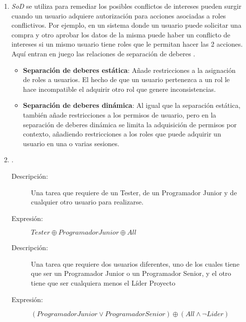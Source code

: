 \documentclass[10pt,a4paper]{article}
\begin{document}
\begin{enumerate}[label=\alph*]
\item
\textit{SoD} se utiliza para remediar los posibles conflictos de intereses pueden surgir cuando un usuario adquiere autorización para acciones asociadas a roles conflictivos. Por ejemplo, en un sistema donde un usuario puede solicitar una compra y otro aprobar los datos de la misma puede haber un conflicto de intereses si un mismo usuario tiene roles que le permitan hacer las 2 acciones. Aquí entran en juego las relaciones de separación de deberes \cite{nist}.
\begin{itemize}
\item \textbf{Separación de deberes estática}: Añade restricciones a la asignación de roles a usuarios. El hecho de que un usuario pertenezca a un rol le hace incompatible el adquirir otro rol que genere inconsistencias.
\item \textbf{Separación de deberes dinámica}: Al igual que la separación estática, también añade restricciones a los permisos de usuario, pero en la separación de deberes dinámica se limita la adquisición de permisos por contexto, añadiendo restricciones a los roles que puede adquirir un usuario en una o varias sesiones.
\end{itemize}

\item .
\begin{description}
    \item[Descripción:] Una tarea que requiere de un Tester, de un Programador Junior y de cualquier otro usuario para realizarse.
    \item[Expresión:] $Tester \oplus Programador Junior \oplus All$
\end{description}

\begin{description}
    \item[Descripción:] Una tarea que requiere dos usuarios diferentes, uno de los cuales tiene que ser un Programador Junior o un Programador Senior, y el otro tiene que ser cualquiera menos el Líder Proyecto
    \item[Expresión:] $(Programador Junior \vee Programador Senior ) \oplus (All \wedge \neg Lider)$
\end{description}

\end{enumerate}
\end{document}
